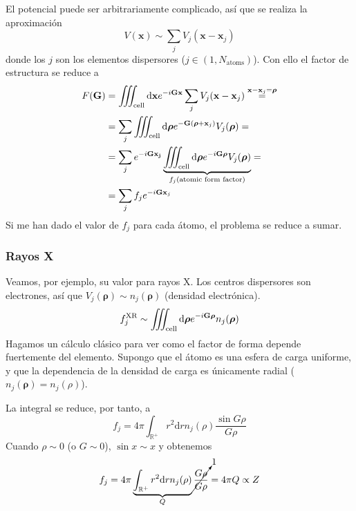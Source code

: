El potencial puede ser arbitrariamente complicado, así que se realiza la
aproximación
\begin{equation}
  V(\mathbf{x}) \sim \sum_j V_j(\mathbf{x}-\mathbf{x}_j)
\end{equation}
donde los $j$ son los elementos dispersores ($j \in (1,N_\text{atoms})$). Con
ello el factor de estructura se reduce a
\begin{equation}
\begin{split}
  F(\mathbf{G}) &= \myiiint_\text{cell} \text{d}\mathbf{x} e ^{-i\mathbf{G}\mathbf{x}}\sum_j V_j (\mathbf{x}-\mathbf{x}_j)  \stackrel{\mathbf{x}-\mathbf{x}_j=\boldsymbol{\rho}}{=} \\
                &= \sum_j \myiiint_\text{cell} \text{d}\boldsymbol{\rho} e ^{-\mathbf{G}(\boldsymbol{\rho}+\mathbf{x}_j)}V_j(\boldsymbol{\rho}) = \\
                &= \sum_j e ^{-i\mathbf{G}\mathbf{x_j}} \underbrace{\myiiint_\text{cell}\text{d}\boldsymbol{\rho}e ^{-i\mathbf{G}\boldsymbol{\rho}}V_j(\boldsymbol{\rho})}_{f_j (\text{atomic form factor})} = \\
&= \sum_j f_j e ^{-i\mathbf{G}\mathbf{x}_j}
\end{split}
\end{equation}
Si me han dado el valor de $f_j$ para cada átomo, el problema se reduce a sumar.

\subsubsection{Rayos X}
Veamos, por ejemplo, su valor para rayos X. Los centros dispersores son
electrones, así que $V_j(\boldsymbol{\rho})\sim n_j(\boldsymbol{\rho})$ (densidad
electrónica).
\begin{equation}
  f_j^\text{XR} \sim \myiiint_\text{cell} \text{d}\boldsymbol{\rho} e ^{-i\mathbf{G}\boldsymbol{\rho}}n_j(\boldsymbol{\rho})
\end{equation} 
Hagamos un cálculo clásico para ver como el factor de forma depende fuertemente
del elemento. Supongo que el átomo es una esfera de carga uniforme, y que la
dependencia de la densidad de carga es únicamente radial ($n_j(\boldsymbol{\rho})=n_j(\rho)$).

La integral se reduce, por tanto, a 
\begin{equation}
  f_j = 4\pi \int_{\mathbb{R}^+} r^2 \text{d}r n_j (\rho) \frac{\sin G\rho}{G\rho}
\end{equation}
Cuando $\rho \sim 0 $ (o $G \sim 0$), $\sin x \sim x$ y obtenemos
\begin{equation}
  f_j = 4\pi \underbrace{\int_{\mathbb{R}^+} r^2 \text{d}r n_j (\rho)}_{Q} \cancelto{1}{\frac{G\rho}{G\rho}} = 4\pi Q \propto Z
\end{equation}

